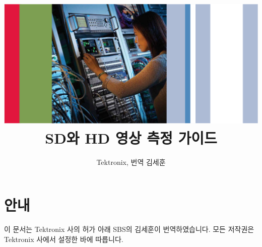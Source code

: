\documentclass[10pt,twocolumn]{book}
\title{\includegraphics[width=15cm]{cover.png} \\SD와 HD 영상 측정 가이드}
\author{Tektronix, 번역 김세훈}
\begin{document}
\maketitle
\tableofcontents

\onecolumn
\section{안내}
이 문서는 Tektronix 사의 허가 아래 SBS의 김세훈이 번역하였습니다. 모든 저작권은 Tektronix 사에서 설정한 바에 따릅니다.

\twocolumn





















\printindex
\end{document}

